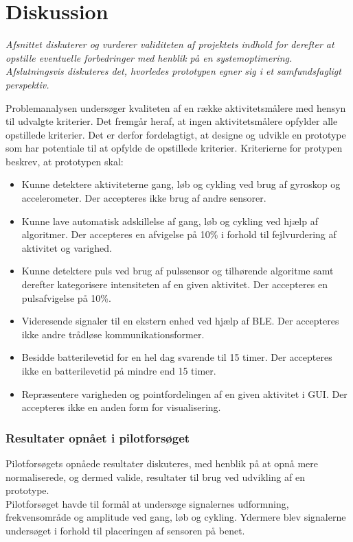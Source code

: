 \section{Diskussion}\label{sec:diskussion}
\textit{Afsnittet diskuterer og vurderer validiteten af projektets indhold%
 for derefter at opstille eventuelle forbedringer med henblik på en systemoptimering. Afslutningsvis diskuteres det, hvorledes prototypen egner sig i et samfundsfagligt perspektiv.}

Problemanalysen undersøger kvaliteten af en række aktivitetsmålere med hensyn til udvalgte kriterier. Det fremgår heraf, at ingen aktivitetsmålere opfylder alle opstillede kriterier. Det er derfor fordelagtigt, at designe og udvikle en prototype som har potentiale til at opfylde de opstillede kriterier. Kriterierne for protypen beskrev, at prototypen skal:
\begin{itemize}
	\item Kunne detektere aktiviteterne gang, løb og cykling ved brug af gyroskop og accelerometer. Der accepteres ikke brug af andre sensorer.
	\item Kunne lave automatisk adskillelse af gang, løb og cykling ved hjælp af algoritmer. Der accepteres en afvigelse på 10\% i forhold til fejlvurdering af aktivitet og varighed.
	\item Kunne detektere puls ved brug af pulssensor og tilhørende algoritme samt derefter kategorisere intensiteten af en given aktivitet. Der accepteres en pulsafvigelse på 10\%.
	\item Videresende signaler til en ekstern enhed ved hjælp af BLE. Der accepteres ikke andre trådløse kommunikationsformer.
	\item Besidde batterilevetid for en hel dag svarende til 15 timer. Der accepteres ikke en batterilevetid på mindre end 15 timer.
	\item Repræsentere varigheden og pointfordelingen af en given aktivitet i GUI. Der accepteres ikke en anden form for visualisering. 
\end{itemize}


\subsubsection{Resultater opnået i pilotforsøget}
Pilotforsøgets opnåede resultater diskuteres, med henblik på at opnå mere normaliserede, og dermed valide, resultater til brug ved udvikling af en prototype.\\
Pilotforsøget havde til formål at undersøge signalernes udformning, frekvensområde og amplitude ved gang, løb og cykling. Ydermere blev signalerne undersøget i forhold til placeringen af sensoren på benet. 

